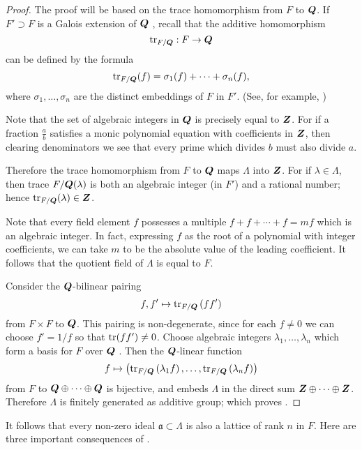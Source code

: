 \begin{proof}
The proof will be based on the trace homomorphism from $F$ to $\bm{Q}$. If $F' \supset F$ is a Galois extension of $\bm{Q}$ , recall that the additive homomorphism
\[
\operatorname{tr}_{F / \bm{Q}}: F \to \bm{Q}
\]
can be defined by the formula
\[
\operatorname{tr}_{F / \bm{Q}}(f)=\sigma_{1}(f)+\cdots+\sigma_{n}(f),
\]
where $\sigma_{1}, \ldots, \sigma_{n}$ are the distinct embeddings of $F$ in $F'$. (See, for example, \cite{Lang2012})

Note that the set of algebraic integers in $\bm{Q}$ is precisely equal to $\bm{Z}$. For if a fraction $\frac{a}{b} $ satisfies a monic polynomial equation with coefficients in $\bm{Z}$, then clearing denominators we see that every prime which divides $b$ must also divide $a$.

Therefore the trace homomorphism from $F$ to $\bm{Q}$ maps $\Lambda$ into $\bm{Z}$. For if $\lambda \in \Lambda$, then trace $F / \bm{Q}(\lambda)$ is both an algebraic integer (in $F'$) and a rational number; hence $\operatorname{tr}_{F / \bm{Q}}(\lambda) \in \bm{Z}$.

Note that every field element $f$ possesses a multiple $f+f+\cdots+f=mf$ which is an algebraic integer. In fact, expressing $f$ as the root of a polynomial with integer coefficients, we can take $m$ to be the absolute value of the leading coefficient. It follows that the quotient field of $\Lambda$ is equal to $F$.

Consider the $\bm{Q}$-bilinear pairing
\[
f, f' \mapsto \operatorname{tr}_{F / \bm{Q}}\left(ff'\right)
\]
from $F \times F$ to $\bm{Q}$. This pairing is non-degenerate, since for each $f \neq 0$ we can choose $f'=1 / f$ so that $\operatorname{tr}(ff') \neq 0$. Choose algebraic integers $\lambda_{1}, \ldots, \lambda_{n}$ which form a basis for $F$ over $\bm{Q}$ . Then the $\bm{Q}$-linear function
\[
f \mapsto\left(\operatorname{tr}_{F / \bm{Q}}\left(\lambda_{1} f\right), \ldots, \operatorname{tr}_{F / \bm{Q}}\left(\lambda_{n} f\right)\right)
\]
from $F$ to $\bm{Q} \oplus \cdots \oplus \bm{Q}$ is bijective, and embeds $\Lambda$ in the direct sum $\bm{Z} \oplus \cdots \oplus \bm{Z}$. Therefore $\Lambda$ is finitely generated as additive group; which proves .
\end{proof}

It follows that every non-zero ideal $\mathfrak{a} \subset \Lambda$ is also a lattice of rank $n$ in $F$. Here are three important consequences of .

